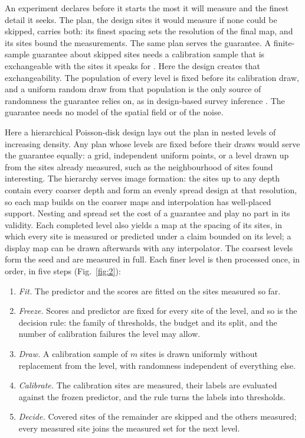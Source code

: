 \documentclass{iopjournal}
\providecommand{\tightlist}{\setlength{\itemsep}{0pt}\setlength{\parskip}{0pt}}
\begin{document}
An experiment declares before it starts the most it will measure and the finest detail it seeks. The plan, the design sites it would measure if none could be skipped, carries both: its finest spacing sets the resolution of the final map, and its sites bound the measurements. The same plan serves the guarantee. A finite-sample guarantee about skipped sites needs a calibration sample that is exchangeable with the sites it speaks for \cite{Vovk2005}. Here the design creates that exchangeability. The population of every level is fixed before its calibration draw, and a uniform random draw from that population is the only source of randomness the guarantee relies on, as in design-based survey inference \cite{Neyman1934,Cochran1977}. The guarantee needs no model of the spatial field or of the noise.

Here a hierarchical Poisson-disk design \cite{Bridson2007} lays out the plan in nested levels of increasing density. Any plan whose levels are fixed before their draws would serve the guarantee equally: a grid, independent uniform points, or a level drawn up from the sites already measured, such as the neighbourhood of sites found interesting. The hierarchy serves image formation: the sites up to any depth contain every coarser depth and form an evenly spread design at that resolution, so each map builds on the coarser maps and interpolation has well-placed support. Nesting and spread set the cost of a guarantee and play no part in its validity. Each completed level also yields a map at the spacing of its sites, in which every site is measured or predicted under a claim bounded on its level; a display map can be drawn afterwards with any interpolator. The coarsest levels form the seed and are measured in full. Each finer level is then processed once, in order, in five steps (Fig.~\ref{fig:2}):

\begin{enumerate}
\def\labelenumi{\arabic{enumi}.}
\tightlist
\item
  \emph{Fit.} The predictor and the scores are fitted on the sites measured so far.
\item
  \emph{Freeze.} Scores and predictor are fixed for every site of the level, and so is the decision rule: the family of thresholds, the budget and its split, and the number of calibration failures the level may allow.
\item
  \emph{Draw.} A calibration sample of \(m\) sites is drawn uniformly without replacement from the level, with randomness independent of everything else.
\item
  \emph{Calibrate.} The calibration sites are measured, their labels are evaluated against the frozen predictor, and the rule turns the labels into thresholds.
\item
  \emph{Decide.} Covered sites of the remainder are skipped and the others measured; every measured site joins the measured set for the next level.
\end{enumerate}
\end{document}
